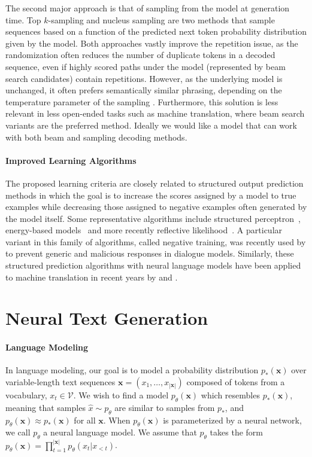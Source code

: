 The second major approach is that of sampling from the model at generation time. Top $k$-sampling \citep{fan2018hierarchical} and nucleus sampling \citep{holtzman2019curious} are two methods that sample sequences based on a function of the predicted next token probability distribution given by the model. Both approaches vastly improve the repetition issue, as the randomization often reduces the number of duplicate tokens in a decoded sequence, even if highly scored paths under the model (represented by beam search candidates) contain repetitions. However, as the underlying model is unchanged, it often prefers semantically similar phrasing, depending on the temperature parameter of the sampling \citep{holtzman2019curious}. Furthermore, this solution is less relevant in less open-ended tasks such as machine translation, where beam search variants are the preferred method. Ideally we would like a model that can work with both beam and sampling decoding methods.

\paragraph{Improved Learning Algorithms}

The proposed learning criteria are closely related to structured output prediction methods in which the goal is to increase the scores assigned by a model to true examples while decreasing those assigned to negative examples often generated by the model itself. Some representative algorithms include structured perceptron~\citep{collins-2002-discriminative}, energy-based models~\citep{lecun2006tutorial} and more recently reflective likelihood~\citep{dieng2018learning}. A particular variant in this family of algorithms, called negative training, was recently used by \citet{he2019negative} to prevent generic and malicious responses in dialogue models. Similarly, these structured prediction algorithms with neural language models have been applied to machine translation in recent years by \citet{shen2015minimum} and \citet{edunov2017classical}. 

\section{Neural Text Generation}

\paragraph{Language Modeling} In language modeling, our goal is to model a probability distribution $p_*(\textbf{x})$ over variable-length text sequences $\textbf{x}=(x_1,\ldots,x_{|\textbf{x}|})$ composed of tokens from a vocabulary, $x_t\in \mathcal{V}$. We wish to find a model $p_\theta(\textbf{x})$ which resembles $p_*(\textbf{x})$, meaning that samples $\hat{x}\sim p_{\theta}$ are similar to samples from $p_*$, and 
$p_{\theta}(\textbf{x})\approx p_*(\textbf{x})$ for all $\textbf{x}$.
When $p_{\theta}(\textbf{x})$ is parameterized by a neural network, we call $p_{\theta}$ a neural language model. We assume that $p_{\theta}$ takes the form 
        $p_{\theta}(\textbf{x}) = \prod_{t=1}^{|\textbf{x}|} p_{\theta}(x_{t}|x_{<t})$.

